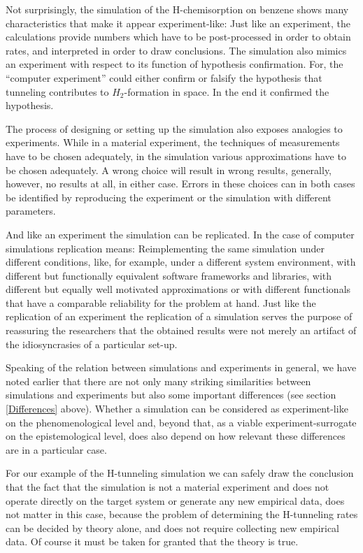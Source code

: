 \documentclass[12pt, a4paper]{article}
\numberwithin{equation}{section}
\begin{document}
Not surprisingly, the simulation of the H-chemisorption on benzene shows
many characteristics that make it appear experiment-like: Just like an
experiment, the calculations provide numbers which have to be
post-processed in order to obtain rates, and interpreted in order to
draw conclusions. The simulation also mimics an experiment with respect
to its function of hypothesis confirmation. For, the ``computer
experiment'' could either confirm or falsify the hypothesis that
tunneling contributes to $H_2$-formation in space. In the end it
confirmed the hypothesis.

The process of designing or setting up the simulation also exposes
analogies to experiments. While in a material experiment, the techniques
of measurements have to be chosen adequately, in the simulation various
approximations have to be chosen adequately. A wrong choice will result
in wrong results, generally, however, no results at all, in either case.
Errors in these choices can in both cases be identified by reproducing
the experiment or the simulation with different parameters.

And like an experiment the simulation can be replicated.
In the case of computer simulations replication means: Reimplementing
the same simulation under different conditions, like, for example,
under a different system environment, with different but functionally
equivalent software frameworks and libraries, with different but
equally well motivated approximations or with different functionals
that have a comparable reliability for the problem at hand. Just like
the replication of an experiment the replication of a simulation serves
the purpose of reassuring the researchers that the obtained
results were not merely an artifact of the idiosyncrasies of a
particular set-up.

Speaking of the relation between simulations and experiments in general,
we have noted earlier that there are not only many striking similarities
between simulations and experiments but also some important 
differences (see section \ref{Differences}
above). Whether a simulation can be considered as experiment-like on the
phenomenological level and, beyond that, as a viable
experiment-surrogate on the epistemological level, does also depend on
how relevant these differences are in a particular case. 

For our example of the H-tunneling simulation we can safely draw the
conclusion that the fact that the simulation is not a material
experiment and does not operate directly on the target system or
generate any new empirical data, does not matter in this case, because
the problem of determining the H-tunneling rates can be decided by
theory alone, and does not require collecting new empirical data. Of
course it must be taken for granted that the theory is true.
\end{document}
